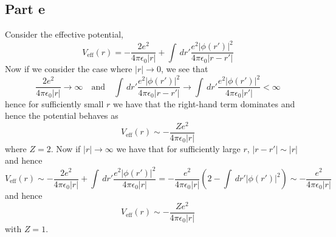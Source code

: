 \documentclass[12pt]{report}
\theoremstyle{custom}
\begin{document}
\subsection*{Part e}
Consider the effective potential,
\begin{equation*}
    V_{\text{eff}}(r) = -\frac{2e^2}{4\pi \epsilon_0 |r|} + \int \, dr' \frac{e^2 |\phi(r')|^2}{4\pi \epsilon_0 |r-r'|}
\end{equation*}
Now if we consider the case where $|r| \to 0$, we see that 
\begin{equation*}
    \frac{2e^2}{4\pi \epsilon_0 |r|} \to \infty \quad \text{and} \quad \int \, dr' \frac{e^2 |\phi(r')|^2}{4\pi \epsilon_0 |r-r'|} \to \int \, dr' \frac{e^2 |\phi(r')|^2}{4\pi \epsilon_0 |r'|} < \infty
\end{equation*}
hence for sufficiently small $r$ we have that the right-hand term dominates and hence the potential behaves as
\begin{equation*}
V_{\text{eff}}(r) \sim -\frac{Ze^2}{4\pi \epsilon_0 |r|}  
\end{equation*}
where $Z = 2$. Now if $|r| \to \infty$ we have that for sufficiently large $r$, $|r-r'| \sim |r|$ and hence
\begin{equation*}
    V_{\text{eff}}(r) \sim -\frac{2e^2}{4\pi \epsilon_0 |r|} + \int \, dr' \frac{e^2 |\phi(r')|^2}{4\pi \epsilon_0 |r|} = -\frac{e^2}{4\pi \epsilon_0 |r|} \left(2 - \int \, dr' |\phi(r')|^2\right) \sim -\frac{e^2}{4\pi \epsilon_0 |r|}
\end{equation*}
and hence
\begin{equation*}
     V_{\text{eff}}(r) \sim -\frac{Ze^2}{4\pi \epsilon_0 |r|}
\end{equation*}
with $Z = 1$.
\end{document}
